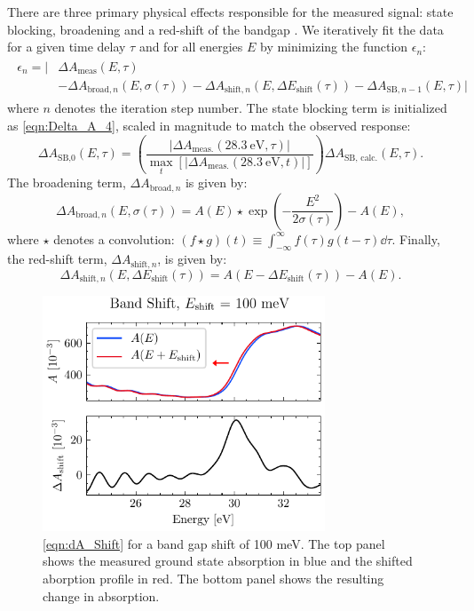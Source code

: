 There are three primary physical effects responsible for the measured signal: state blocking, broadening and a red-shift of the bandgap \cite{zurchDirectSimultaneousObservation2017}. We iteratively fit the data for a given time delay $\tau$ and for all energies $E$ by minimizing the function $\epsilon_n$:
\begin{align}
\begin{split}
\epsilon_n = \Big| & \Delta A_{\textrm{meas}}(E,\tau) \\
&- \Delta A_{\textrm{broad},n}(E,\sigma(\tau)) - \Delta A_{\textrm{shift},n}(E,\Delta E_{\textrm{shift}}(\tau)) - \Delta A_{\textrm{SB},n-1}(E,\tau) \Big|
\end{split}
\end{align}
where $n$ denotes the iteration step number. The state blocking term is initialized as \cref{eqn:Delta_A_4}, scaled in magnitude to match the observed response:
\begin{equation}
\Delta A_{\textrm{SB,0}}(E, \tau) = \left( \frac{|\Delta A_{\textrm{meas.}}(28.3 \ \textrm{eV}, \tau)|}{\max_{t}[|\Delta A_{\textrm{meas.}}(28.3 \ \textrm{eV}, t)|]} \right) \Delta A_{\textrm{SB, calc.}}(E, \tau).
\end{equation}
The broadening term, $\Delta A_{\textrm{broad},n}$ is given by:
\begin{equation}
\Delta A_{\textrm{broad},n}(E, \sigma(\tau)) = A(E) \star \exp \left(- \frac{E^2}{2 \sigma(\tau)} \right) - A(E),
\end{equation}
where $\star$ denotes a convolution: $(f \star g)(t) \equiv \int_{-\infty}^{\infty} f(\tau) g(t-\tau) \dd{\tau}$. Finally, the red-shift term, $\Delta A_{\textrm{shift},n}$, is given by:
\begin{equation}
\Delta A_{\textrm{shift},n}(E, \Delta E_{\textrm{shift}}(\tau)) = A(E-\Delta E_{\textrm{shift}}(\tau)) - A(E).
\label{eqn:dA_Shift}
\end{equation}

\begin{figure}
	\centering
	\includegraphics[width=0.75\textwidth]{figures/chap4/dA_Shift.pdf}
	\caption{\cref{eqn:dA_Shift} for a band gap shift of 100 meV. The top panel shows the measured ground state absorption in blue and the shifted aborption profile in red. The bottom panel shows the resulting change in absorption.}
	\label{fig:dA_Shift}
\end{figure}

